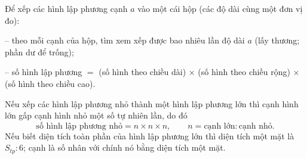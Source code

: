 \begin{knowbox}
Để xếp các hình lập phương cạnh $a$ vào một cái hộp (các độ dài cùng một đơn vị đo):\par
\smallskip
-- theo mỗi cạnh của hộp, tìm xem xếp được bao nhiêu lần độ dài $a$ (lấy thương; phần dư để trống);\par
-- số hình lập phương $=$ (số hình theo chiều dài) $\times$ (số hình theo chiều rộng) $\times$ (số hình theo chiều cao).\par
\smallskip
Nếu xếp các hình lập phương nhỏ thành một hình lập phương lớn thì cạnh hình lớn gấp cạnh hình nhỏ một số tự nhiên lần, do đó
\[\text{số hình lập phương nhỏ}=n\times n\times n,\qquad n=\text{cạnh lớn}:\text{cạnh nhỏ}.\]
Nếu biết diện tích toàn phần của hình lập phương lớn thì diện tích một mặt là $S_{tp}:6$; cạnh là số nhân với chính nó bằng diện tích một mặt.
\end{knowbox}


